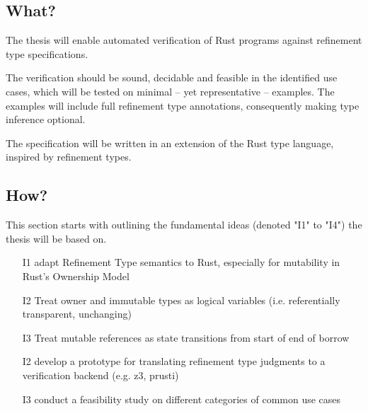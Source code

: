 \documentclass[11pt]{article}
\begin{document}


\subsection{What?}


The thesis will enable automated verification of Rust programs against refinement type specifications.

The verification should be sound, decidable and feasible in the identified use cases, which will be tested on minimal -- yet representative -- examples. The examples will include full refinement type annotations, consequently making type inference optional.

The specification will be written in an extension of the Rust type language, inspired by refinement types.

\subsection{How?} \label{ssec:How}

This section starts with outlining the fundamental ideas (denoted "I1" to "I4") the thesis will be based on.

\begin{itemize}
	\item[I1] adapt Refinement Type semantics to Rust, especially for mutability in Rust's Ownership Model
	\item[I2] Treat owner and immutable types as logical variables (i.e. referentially transparent, unchanging)
	\item[I3] Treat mutable references as state transitions from start of end of borrow
	\item[I2] develop a prototype for translating refinement type judgments to a verification backend (e.g. z3, prusti)
	\item[I3] conduct a feasibility study on different categories of common use cases
\end{itemize}
\end{document}

